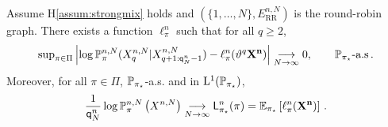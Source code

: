 \begin{theorem}\label{thm:ConvVrais}
Assume H\ref{assum:strongmix} holds and $(\{1,\ldots,N\},E^{n,N}_{\text{RR}})$ is the round-robin graph. 
There exists a function $\ell_{\pi}^{n}$ such that for all $q\ge 2$,
\begin{equation}\label{eq:bound:loglik}
\sup_{\pi\in\Pi} \absj{\log \likelihood{n,N}{\pi}(X_{q}^{n,N}|X_{q+1:\ordermax{n}{N}-1}^{n,N})-\ell_{\pi}^{n}(\shift^q{\bf X^{n}})}\limit{N}0,\qquad \Pstar\mbox{-a.s}\eqsp. 
\end{equation}
Moreover, for all $\pi\in\Pi$, $\mathbb{P}_{\pi_{\star}}$-a.s.  and in $\mathrm{L}^1(\mathbb{P}_{\pi_{\star}})$,
\begin{equation}\label{eq:ApproxRisk}
\frac{1}{\ordermax{n}{N}}\log \likelihood{n,N}{\pi}\left(X^{n,N}\right) \limit{N} \kullback^n_{\bayes}(\pi) = \E_{\bayes}\left[\ell_{\pi}^{n}({\bf X^{n}})\right]\eqsp. 
\end{equation}
\end{theorem}

